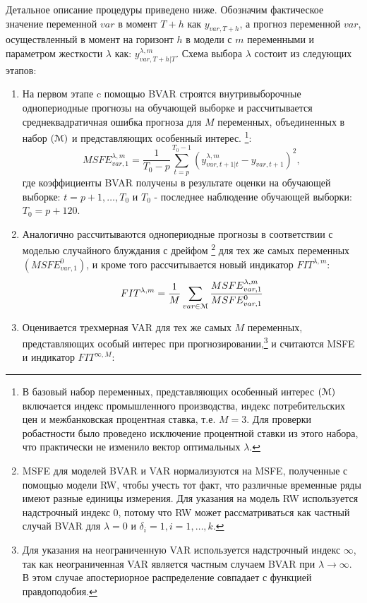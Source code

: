 \documentclass[11pt]{article} %
\begin{document}
Детальное описание процедуры приведено ниже. Обозначим фактическое значение переменной $var$ в момент $T+h$ как $y_{var,T+h}$, а прогноз переменной $var$, осуществленный в момент на горизонт $h$ в модели с $m$ переменными  и параметром жесткости $\lambda$  как: $y_{var, T+h|T}^{\lambda,m}$.
Схема выбора $\lambda$ состоит из следующих этапов:


\begin{enumerate}
\item На первом этапе c помощью BVAR строятся внутривыборочные однопериодные прогнозы на обучающей выборке и рассчитывается среднеквадратичная ошибка прогноза для $M$ переменных, объединенных в набор $(\EuScript{M})$ и представляющих особенный интерес. \footnote{В базовый набор переменных, представляющих особенный интерес $(\EuScript{M})$ включается индекс промышленного производства, индекс потребительских цен и межбанковская процентная ставка, т.е.  $M=3$. Для проверки робастности было проведено исключение процентной ставки из этого набора, что практически не изменило вектор оптимальных  $\lambda$.}:
\begin{equation}
MSFE_{var,1}^{\lambda,m}=\frac{1}{T_0 - p}\sum_{t=p}^{T_0-1} \left(y_{var,t+1|t}^{\lambda,m}-y_{var,t+1}\right)^2,
\end{equation}
\noindent где коэффициенты BVAR получены в результате оценки на обучающей выборке: $t=p+1,\ldots, T_0$ и $T_0$ - последнее наблюдение обучающей выборки: $T_0=p+120$.
\item Аналогично рассчитываются однопериодные прогнозы в соответствии с моделью случайного блуждания с дрейфом \footnote{MSFE для  моделей BVAR и  VAR нормализуются на MSFE, полученные с помощью модели RW, чтобы учесть тот факт, что различные временные ряды имеют разные единицы измерения. Для указания на модель RW используется надстрочный индекс 0, потому что RW может рассматриваться как частный случай BVAR для $\lambda=0$ и $\delta_i=1, i=1,\ldots,k$.} для тех же самых переменных $\left(MSFE_{var,1}^0\right)$, и кроме того рассчитывается новый индикатор $FIT^{\lambda,m}$:
\begin{equation}
FIT^{\lambda,m}=\frac{1}{M} \sum_{var\in \EuScript{M}} \frac{MSFE_{var,1}^{\lambda,m}}{MSFE_{var,1}^{0}}
\end{equation}
\item Оценивается трехмерная VAR для  тех же самых $M$ переменных, представляющих особый интерес при прогнозировании,\footnote{Для указания на неограниченную VAR используется надстрочный индекс $\infty$, так как неограниченная VAR является частным случаем BVAR при $\lambda\to \infty$. В этом случае апостериорное распределение совпадает с функцией правдоподобия.}  и считаются MSFE  и индикатор  $FIT^{\infty,M}$:


\end{enumerate}
\end{document}

